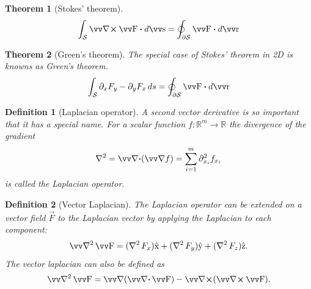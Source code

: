 \documentclass[twocolumn, margin=small]{tex/hsrzf}
\theoremstyle{fuvarzf}
\newtheorem{theorem}{Theorem}
\newtheorem{definition}{Definition}
\begin{document}
\begin{theorem}[Stokes' theorem]
  \[
    \int_\mathcal{S} \curl \vec{F} \dotp d\vec{s}
    = \oint_{\partial\mathcal{S}} \vec{F} \dotp d\vec{r}
  \]
\end{theorem}

\begin{theorem}[Green's theorem]
  The special case of Stokes' theorem in 2D is knowns as Green's theorem.
  \[
    \int_\mathcal{S} \partial_x F_y - \partial_y F_x \,ds
    = \oint_{\partial\mathcal{S}} \vec{F} \dotp d\vec{r}
  \]
\end{theorem}

\begin{definition}[Laplacian operator]
  A second vector derivative is so important that it has a special name.  For a
  scalar function \(f: \mathbb{R}^m \to \mathbb{R}\) the divergence of the
  gradient
  \[
    \laplacian = \div (\grad f) = \sum_{i=1}^m \partial_{x_i}^2 f_{x_i}
  \]
  is called the \emph{Laplacian operator}.
\end{definition}

\begin{definition}[Vector Laplacian]
  The Laplacian operator can be extended on a vector field \(\vec{F}\) to the 
  \emph{Laplacian vector} by applying the Laplacian to each component:
  \[
    \vlaplacian \vec{F} 
      = (\laplacian F_x)\uvec{x} 
      + (\laplacian F_y)\uvec{y} 
      + (\laplacian F_z)\uvec{z} .
  \]
  The vector laplacian can also be defined as
  \[
    \vlaplacian \vec{F} = \grad (\div \vec{F}) - \curl (\curl \vec{F}).
  \]
\end{definition}
\end{document}
